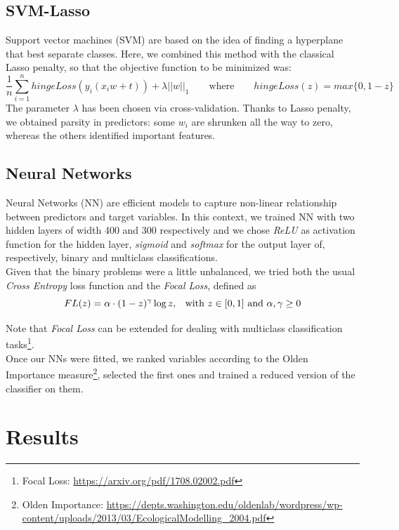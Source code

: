 \documentclass[a4paper,11pt, oneside]{article}  %
\begin{document}
\subsection{SVM-Lasso}
Support vector machines (SVM) are based on the idea of finding a hyperplane that best separate classes. Here, we combined this method with the classical Lasso penalty, so that the objective function to be minimized was:
\begin{equation*}
\dfrac{1}{n} \sum_{i=1}^n hingeLoss(y_i(x_i w + t)) + \lambda ||w||_1  \qquad	\text{where} \qquad  hingeLoss(z) = max\{0, 1-z\}
\end{equation*}
The parameter $\lambda$ has been chosen via cross-validation. Thanks to Lasso penalty, we obtained parsity in predictors: some $w_i$ are shrunken all the way to zero, whereas the others identified important features. 

\subsection{Neural Networks}
Neural Networks (NN) are efficient models to capture non-linear relationship between predictors and target variables. In this context, we trained NN with two hidden layers of width 400 and 300 respectively and we chose \textit{ReLU} as activation function for the hidden layer, \textit{sigmoid} and \textit{softmax} for the output layer of, respectively, binary and multiclass classifications. \\
Given that the binary problems were a little unbalanced, we tried both the usual \textit{Cross Entropy} loss function and the \textit{Focal Loss}, defined as 
\begin{equation*}
	FL(z) = \alpha \cdot (1 - z)^{\gamma} \log{z} \text{,  \hspace{3pt} with }z \in [0,1]  \text{ and } \alpha,  \gamma \geq 0
\end{equation*}

Note that \textit{Focal Loss} can be extended for dealing with multiclass classification tasks\footnote{Focal Loss: \url{https://arxiv.org/pdf/1708.02002.pdf}}. \\
Once our NNs were fitted,  we ranked variables according to the Olden Importance measure\footnote{Olden Importance: \url{https://depts.washington.edu/oldenlab/wordpress/wp-content/uploads/2013/03/EcologicalModelling_2004.pdf}}, selected the first ones and trained a reduced version of the classifier on them.

\section{Results}
\end{document}
